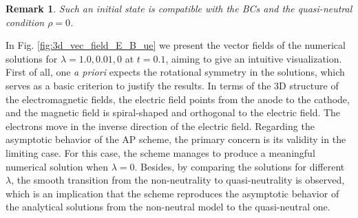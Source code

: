 \documentclass{article}
\newtheorem*{remark}{Remark}
\begin{document}
\begin{remark}
    Such an initial state is compatible with the BCs and the quasi-neutral condition $\rho = 0$. 
\end{remark}

In Fig. \ref{fig:3d_vec_field_E_B_ue} we present the vector fields of the numerical solutions for $\lambda = 1.0, 0.01, 0$ at $t = 0.1$, aiming to give an intuitive visualization. First of all, one \emph{a priori} expects the rotational symmetry in the solutions, which serves as a basic criterion to justify the results. In terms of the 3D structure of the electromagnetic fields, the electric field points from the anode to the cathode, and the magnetic field is spiral-shaped and orthogonal to the electric field. The electrons move in the inverse direction of the electric field. Regarding the asymptotic behavior of the AP scheme, the primary concern is its validity in the limiting case. For this case, the scheme manages to produce a meaningful numerical solution when $\lambda = 0$. Besides, by comparing the solutions for different $\lambda$, the smooth transition from the non-neutrality to quasi-neutrality is observed, which is an implication that the scheme reproduces the asymptotic behavior of the analytical solutions from the non-neutral model to the quasi-neutral one.
\end{document}
